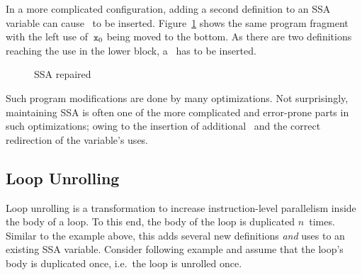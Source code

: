 In a more complicated configuration, adding a second definition to an SSA variable can cause \phiops\ to be inserted.
Figure~\ref{fig:withphis} shows the same program fragment with the left use of~$\mathtt{x}_0$ being moved to the bottom.
As there are two definitions reaching the use in the lower block, a \phiop\ has to be inserted. 

\begin{figure}[htbp]
	\centering
	\qquad
	\caption{SSA repaired}
	\label{fig:withphis}
\end{figure}

Such program modifications are done by many optimizations. 
Not surprisingly, maintaining SSA is often one of the more complicated and error-prone parts in such optimizations;
owing to the insertion of additional \phiops\ and the correct redirection of the variable's uses.

\subsection{Loop Unrolling}

Loop unrolling is a transformation to increase instruction-level parallelism inside the body of a loop.
To this end, the body of the loop is duplicated $n$~times. 
Similar to the example above, this adds several new definitions \emph{and} uses to an existing SSA variable. 
Consider following example and assume that the loop's body is duplicated once, i.e.~the loop is unrolled once.

